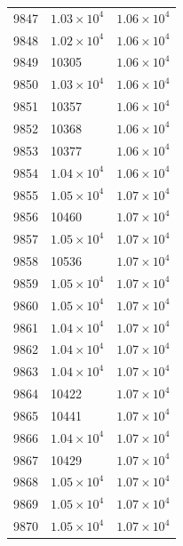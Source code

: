\begin{table}[H]
\begin{tabular}{lll}
9847 & $\displaystyle 1.03 \times 10^{4}$ & $\displaystyle 1.06 \times 10^{4}$ \\
9848 & $\displaystyle 1.02 \times 10^{4}$ & $\displaystyle 1.06 \times 10^{4}$ \\
9849 & 10305 & $\displaystyle 1.06 \times 10^{4}$ \\
9850 & $\displaystyle 1.03 \times 10^{4}$ & $\displaystyle 1.06 \times 10^{4}$ \\
9851 & 10357 & $\displaystyle 1.06 \times 10^{4}$ \\
9852 & 10368 & $\displaystyle 1.06 \times 10^{4}$ \\
9853 & 10377 & $\displaystyle 1.06 \times 10^{4}$ \\
9854 & $\displaystyle 1.04 \times 10^{4}$ & $\displaystyle 1.06 \times 10^{4}$ \\
9855 & $\displaystyle 1.05 \times 10^{4}$ & $\displaystyle 1.07 \times 10^{4}$ \\
9856 & 10460 & $\displaystyle 1.07 \times 10^{4}$ \\
9857 & $\displaystyle 1.05 \times 10^{4}$ & $\displaystyle 1.07 \times 10^{4}$ \\
9858 & 10536 & $\displaystyle 1.07 \times 10^{4}$ \\
9859 & $\displaystyle 1.05 \times 10^{4}$ & $\displaystyle 1.07 \times 10^{4}$ \\
9860 & $\displaystyle 1.05 \times 10^{4}$ & $\displaystyle 1.07 \times 10^{4}$ \\
9861 & $\displaystyle 1.04 \times 10^{4}$ & $\displaystyle 1.07 \times 10^{4}$ \\
9862 & $\displaystyle 1.04 \times 10^{4}$ & $\displaystyle 1.07 \times 10^{4}$ \\
9863 & $\displaystyle 1.04 \times 10^{4}$ & $\displaystyle 1.07 \times 10^{4}$ \\
9864 & 10422 & $\displaystyle 1.07 \times 10^{4}$ \\
9865 & 10441 & $\displaystyle 1.07 \times 10^{4}$ \\
9866 & $\displaystyle 1.04 \times 10^{4}$ & $\displaystyle 1.07 \times 10^{4}$ \\
9867 & 10429 & $\displaystyle 1.07 \times 10^{4}$ \\
9868 & $\displaystyle 1.05 \times 10^{4}$ & $\displaystyle 1.07 \times 10^{4}$ \\
9869 & $\displaystyle 1.05 \times 10^{4}$ & $\displaystyle 1.07 \times 10^{4}$ \\
9870 & $\displaystyle 1.05 \times 10^{4}$ & $\displaystyle 1.07 \times 10^{4}$ \\

\end{tabular}
\end{table}
